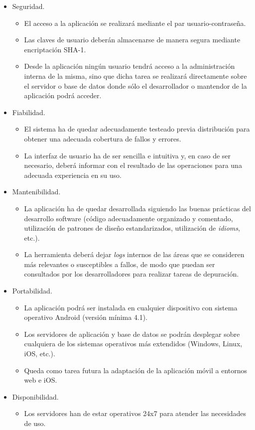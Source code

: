 \begin{itemize}
	\item Seguridad.
	\begin{itemize}
		\item El acceso a la aplicación se realizará mediante el par usuario-contraseña.
		\item Las claves de usuario deberán almacenarse de manera segura mediante encriptación SHA-1.
		\item Desde la aplicación ningún usuario tendrá acceso a la administración interna de la misma, sino que dicha tarea se realizará directamente sobre el servidor o base de datos donde sólo el desarrollador o mantendor de la aplicación podrá acceder.
	\end{itemize}
	\item Fiabilidad.
	\begin{itemize}
		\item El sistema ha de quedar adecuadamente testeado previa distribución para obtener una adecuada cobertura de fallos y errores.
		\item La interfaz de usuario ha de ser sencilla e intuitiva y, en caso de ser necesario, deberá informar con el resultado de las operaciones para una adecuada experiencia en su uso.
	\end{itemize}
	\item Mantenibilidad.
	\begin{itemize}
		\item La aplicación ha de quedar desarrollada siguiendo las buenas prácticas del desarrollo software (código adecuadamente organizado y comentado, utilización de patrones de diseño estandarizados, utilización de \textit{idioms}, etc.).
		\item La herramienta deberá dejar \textit{logs} internos de las áreas que se consideren más relevantes o susceptibles a fallos, de modo que puedan ser consultados por los desarrolladores para realizar tareas de depuración.
	\end{itemize}
	\item Portabilidad. 
	\begin{itemize}
		\item La aplicación podrá ser instalada en cualquier dispositivo con sistema operativo Android (versión mínima 4.1).
		\item Los servidores de aplicación y base de datos se podrán desplegar sobre cualquiera de los sistemas operativos más extendidos (Windows, Linux, iOS, etc.).
		\item Queda como tarea futura la adaptación de la aplicación móvil a entornos web e iOS.
	\end{itemize}
	\item Disponibilidad. 
	\begin{itemize}
		\item Los servidores han de estar operativos 24x7 para atender las necesidades de uso.
	\end{itemize}
\end{itemize}

